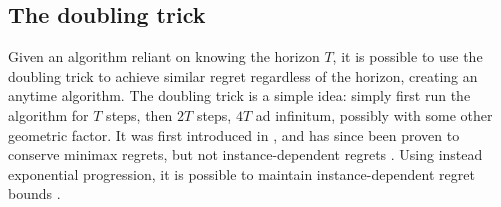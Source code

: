 \subsection{The doubling trick}
Given an algorithm reliant on knowing the horizon $T$, it is possible to use the doubling trick to achieve similar regret regardless of the horizon, creating an anytime algorithm.
The doubling trick is a simple idea: simply first run the algorithm for $T$ steps, then $2T$ steps, $4T$ ad infinitum, possibly with some other geometric factor.
It was first introduced in \cite{auer1995}, and has since been proven to conserve minimax regrets, but not instance-dependent regrets \cite{besson2018}.
Using instead exponential progression, it is possible to maintain instance-dependent regret bounds \cite{besson2018}.